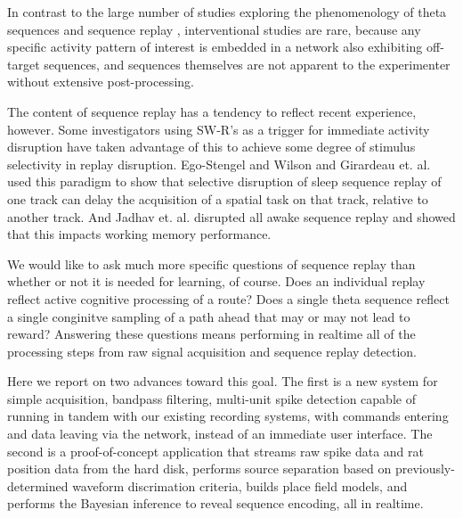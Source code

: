 \documentclass[10pt]{article}
\begin{document}
In contrast to the large number of studies exploring the phenomenology of theta sequences and sequence replay \cite{davidson2009hippocampal,gupta2012segmentation,karlsson2009awake,pfeiffer2013hippocampal,cei2014hippocampal}, interventional studies are rare, because any specific activity pattern of interest is embedded in a network also exhibiting off-target sequences, and sequences themselves are not apparent to the experimenter without extensive post-processing. 

The content of sequence replay has a tendency to reflect recent experience, however. Some investigators using SW-R's as a trigger for immediate activity disruption have taken advantage of this to achieve some degree of stimulus selectivity in replay disruption. Ego-Stengel and Wilson \cite{ego2010disruption} and Girardeau et. al. \cite{girardeau2009selective} used this paradigm to show that selective disruption of sleep sequence replay of one track can delay the acquisition of a spatial task on that track, relative to another track. And Jadhav et. al. \cite{jadhav2012awake} disrupted all awake sequence replay and showed that this impacts working memory performance.

We would like to ask much more specific questions of sequence replay than whether or not it is needed for learning, of course. Does an individual replay reflect active cognitive processing of a route? Does a single theta sequence reflect a single conginitve sampling of a path ahead that may or may not lead to reward? Answering these questions means performing in realtime all of the processing steps from raw signal acquisition and sequence replay detection.

Here we report on two advances toward this goal. The first is a new system for simple acquisition, bandpass filtering, multi-unit spike detection capable of running in tandem with our existing recording systems, with commands entering and data leaving via the network, instead of an immediate user interface. The second is a proof-of-concept application that streams raw spike data and rat position data from the hard disk, performs source separation based on previously-determined waveform discrimation criteria, builds place field models, and performs the Bayesian inference to reveal sequence encoding, all in realtime.
\end{document}
